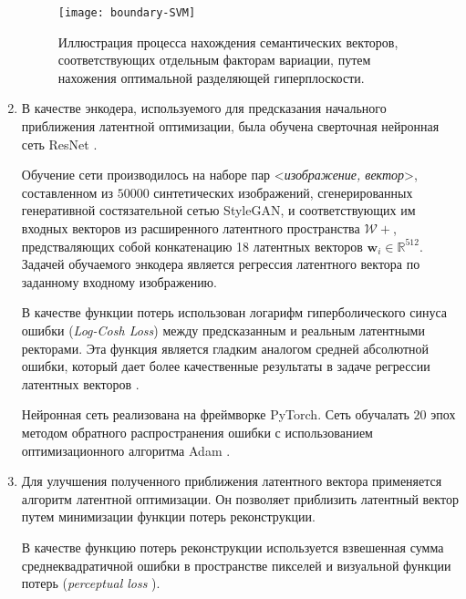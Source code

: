 \begin{enumerate}
\begin{figure}[h]
\begin{center}
    \texttt{[image: boundary-SVM]}
    \caption{Иллюстрация процесса нахождения семантических векторов, соответствующих отдельным факторам вариации, путем нахожения оптимальной разделяющей гиперплоскости.}
    \label{fig:svm-boundary}
\end{center}
\end{figure}


\item 

В качестве энкодера, используемого для предсказания начального приближения латентной оптимизации, была обучена сверточная нейронная сеть ResNet \cite{he2016resnet}.

Обучение сети производилось на наборе пар <\emph{изображение, вектор}>, составленном из $50000$ синтетических изображений, сгенерированных генеративной состязательной сетью StyleGAN, и соответствующих им входных векторов из расширенного латентного пространства $\mathcal W+$, предстваляющих собой конкатенацию 18 латентных векторов $\mathbf w_i \in \mathbb R^{512}$.
Задачей обучаемого энкодера является регрессия латентного вектора по заданному входному изображению.

В качестве функции потерь использован логарифм гиперболического синуса ошибки (\emph{Log-Cosh Loss}) между предсказанным и реальным латентными ректорами. Эта функция является гладким аналогом средней абсолютной ошибки, который дает более качественные результаты в задаче регрессии латентных векторов \cite{chen2019log}.

Нейронная сеть реализована на фреймворке PyTorch. Сеть обучалать $20$ эпох методом обратного распространения ошибки с использованием оптимизационного алгоритма Adam \cite{kingma2014adam}.


\item 

Для улучшения полученного приближения латентного вектора применяется алгоритм латентной оптимизации. Он позволяет приблизить латентный вектор путем минимизации функции потерь реконструкции.

В качестве функцию потерь реконструкции используется взвешенная сумма среднеквадратичной ошибки в пространстве пикселей и визуальной функции потерь (\emph{perceptual loss} \cite{Johnson2016Perceptual}).


\end{enumerate}
